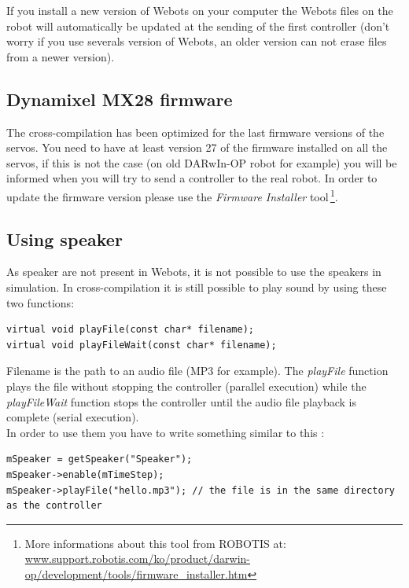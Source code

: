 \documentclass[a4paper, 12pt]{article}  		%
\begin{document}
If you install a new version of Webots on your computer the Webots files on the robot will automatically be updated at the sending of the first controller (don't worry if you use severals version of Webots, an older version can not erase files from a newer version).\\

\subsection{Dynamixel MX28 firmware}
The cross-compilation has been optimized for the last firmware versions of the servos. You need to have at least version 27 of the firmware installed on all the servos, if this is not the case (on old DARwIn-OP robot for example) you will be informed when you will try to send a controller to the real robot. In order to update the firmware version please use the \textit{Firmware Installer} tool\,\footnote{ More informations about this tool from ROBOTIS at: \url{www.support.robotis.com/ko/product/darwin-op/development/tools/firmware_installer.htm}}.\\

\newpage
\subsection{Using speaker}
As speaker are not present in Webots, it is not possible to use the speakers in simulation. In cross-compilation it is still possible to play sound by using these two functions:\\
\lstset{language=c++} 
\lstset{commentstyle=\textit} 
\begin{lstlisting} 
virtual void playFile(const char* filename);
virtual void playFileWait(const char* filename);
\end{lstlisting}
Filename is the path to an audio file (MP3 for example). The \textit{playFile} function plays the file without stopping the controller (parallel execution) while the \textit{playFileWait} function stops the controller until the audio file playback is complete (serial execution).\\

In order to use them you have to write something similar to this :\\
\lstset{language=c++} 
\lstset{commentstyle=\textit} 
\begin{lstlisting} 
mSpeaker = getSpeaker("Speaker");
mSpeaker->enable(mTimeStep);
mSpeaker->playFile("hello.mp3"); // the file is in the same directory as the controller
\end{lstlisting}
\end{document}
